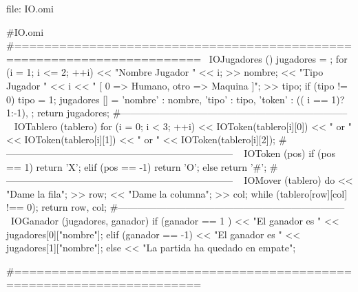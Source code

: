 file: IO.omi
\begin{myverbatim}
#IO.omi
#=======================================================================
~IOJugadores () {
   jugadores = {};
   for (i = 1; i <= 2; ++i) {
      << "Nombre Jugador " << i;
      >> nombre;
      << "Tipo Jugador " << i << " [ 0 => Humano, otro => Maquina ]";
      >> tipo;
      if (tipo != 0) 
         tipo = 1;
      jugadores [] = { 
         'nombre' : nombre,
         'tipo' : tipo,
         'token' : (( i == 1)?1:-1),
      };
   }
   return jugadores; 
}
#-----------------------------------------------------------------------
~ IOTablero (tablero) {
   for (i = 0; i < 3; ++i) 
      << IOToken(tablero[i][0]) << " or " 
         << IOToken(tablero[i][1]) << " or " 
         << IOToken(tablero[i][2]);
}
#-----------------------------------------------------------------------
~ IOToken (pos) {
   if (pos == 1) 
      return 'X';
   elif (pos == -1)
      return 'O';
   else
      return '#';
}
#-----------------------------------------------------------------------
~ IOMover (tablero) {
   do {
      << "Dame la fila";
      >> row;
      << "Dame la columna";
      >> col;
   }while (tablero[row][col] !== 0);
   return {row, col};
}
#-----------------------------------------------------------------------
~IOGanador (jugadores, ganador) {
   if (ganador == 1 ){
      << "El ganador es " << jugadores[0]["nombre"];
   }elif (ganador == -1){
      << "El ganador es " << jugadores[1]["nombre"];
   }else{
      << "La partida ha quedado en empate";
   }
}

#=======================================================================
\end{myverbatim}

